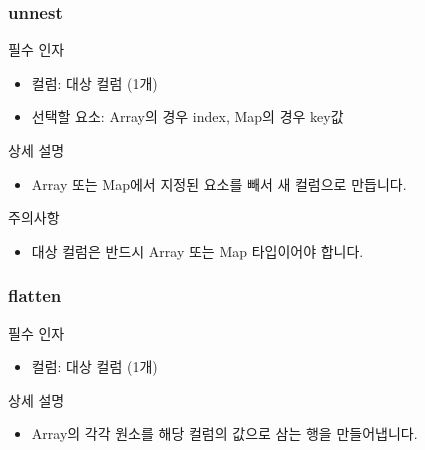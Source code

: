\documentclass[letterpaper,10pt,english]{sphinxmanual}
\begin{document}
\subsubsection{unnest}
\label{\detokenize{discovery/part07/rule_kinds:unnest}}
\begin{figure}[H]
\centering

\noindent{}
\end{figure}

필수 인자
\begin{itemize}
\item {} 
컬럼: 대상 컬럼 (1개)

\item {} 
선택할 요소: Array의 경우  index, Map의 경우 key값

\end{itemize}

상세 설명
\begin{itemize}
\item {} 
Array 또는 Map에서 지정된 요소를 빼서 새 컬럼으로 만듭니다.

\end{itemize}

주의사항
\begin{itemize}
\item {} 
대상 컬럼은 반드시 Array 또는 Map 타입이어야 합니다.

\end{itemize}


\subsubsection{flatten}
\label{\detokenize{discovery/part07/rule_kinds:flatten}}
필수 인자
\begin{itemize}
\item {} 
컬럼: 대상 컬럼 (1개)

\end{itemize}

상세 설명
\begin{itemize}
\item {} 
Array의 각각 원소를 해당 컬럼의 값으로 삼는 행을 만들어냅니다.

\end{itemize}
\end{document}
